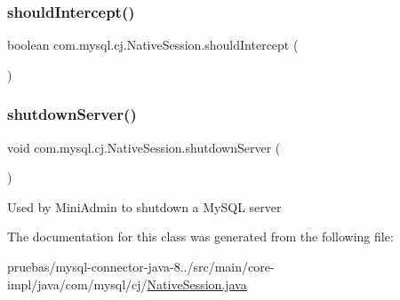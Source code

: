 \mbox{\label{classcom_1_1mysql_1_1cj_1_1_native_session_af6ab4b22c01684f4ce3928c5e2315b06}} 
\subsubsection{\texorpdfstring{should\+Intercept()}{shouldIntercept()}}
{\footnotesize\ttfamily boolean com.\+mysql.\+cj.\+Native\+Session.\+should\+Intercept (\begin{DoxyParamCaption}{ }\end{DoxyParamCaption})}

\mbox{\label{classcom_1_1mysql_1_1cj_1_1_native_session_a7237ecf5054050d24533806a4a548777}} 
\subsubsection{\texorpdfstring{shutdown\+Server()}{shutdownServer()}}
{\footnotesize\ttfamily void com.\+mysql.\+cj.\+Native\+Session.\+shutdown\+Server (\begin{DoxyParamCaption}{ }\end{DoxyParamCaption})}

Used by Mini\+Admin to shutdown a My\+S\+QL server 

The documentation for this class was generated from the following file\+:\begin{DoxyCompactItemize}
\item 
pruebas/mysql-\/connector-\/java-\/8../src/main/core-\/impl/java/com/mysql/cj/\mbox{\hyperlink{_native_session_8java}{Native\+Session.\+java}}\end{DoxyCompactItemize}
